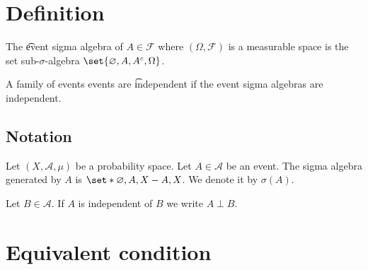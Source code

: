 

\section*{Definition}

The \t{event sigma algebra} of $A \in \mathcal{F} $ where $(\Omega , \mathcal{F} )$ is a measurable space is the set sub-$\sigma $-algebra $\set{\varnothing, A, A^c, \Omega }$.

A family of events events are \t{independent} if the event sigma algebras are independent.

\subsection*{Notation}

Let $(X, \mathcal{A} , \mu )$ be a probability space.
Let $A \in \mathcal{A} $ be an event.
The sigma algebra generated by $A$ is $\set*{\varnothing, A, X - A, X}$.
We denote it by $\sigma (A)$.

Let $B \in \mathcal{A} $.
If $A$ is independent of $B$ we write $A \perp  B$.

\section*{Equivalent condition}

